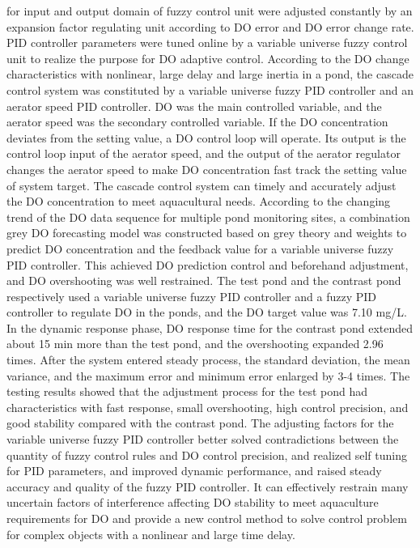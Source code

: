 \documentclass[12pt]{article}
\begin{document}
 for input and output domain of fuzzy control unit were adjusted constantly by an expansion factor regulating unit according to DO error and DO error change rate. PID controller parameters were tuned online by a variable universe fuzzy control unit to realize the purpose for DO adaptive control. According to the DO change characteristics with nonlinear, large delay and large inertia in a pond, the cascade control system was constituted by a variable universe fuzzy PID controller and an aerator speed PID controller. DO was the main controlled variable, and the aerator speed was the secondary controlled variable. If the DO concentration deviates from the setting value, a DO control loop will operate. Its output is the control loop input of the aerator speed, and the output of the aerator regulator changes the aerator speed to make DO concentration fast track the setting value of system target. The cascade control system can timely and accurately adjust the DO concentration to meet aquacultural needs. According to the changing trend of the DO data sequence for multiple pond monitoring sites, a combination grey DO forecasting model was constructed based on grey theory and weights to predict DO concentration and the feedback value for a variable universe fuzzy PID controller. This achieved DO prediction control and beforehand adjustment, and DO overshooting was well restrained. The test pond and the contrast pond respectively used a variable universe fuzzy PID controller and a fuzzy PID controller to regulate DO in the ponds, and the DO target value was 7.10 mg/L. In the dynamic response phase, DO response time for the contrast pond extended about 15 min more than the test pond, and the overshooting expanded 2.96 times.
 After the system entered steady process, the standard deviation, the mean variance, and the maximum error and minimum error enlarged by 3-4 times. The testing results showed that the adjustment process for the test pond had characteristics with fast response, small overshooting, high control precision, and good stability compared with the contrast pond. The adjusting factors for the variable universe fuzzy PID controller better solved contradictions between the quantity of fuzzy control rules and DO control precision, and realized self tuning for PID parameters, and improved dynamic performance, and raised steady accuracy and quality of the fuzzy PID controller. It can effectively restrain many uncertain factors of interference affecting DO stability to meet aquaculture requirements for DO and provide a new control method to solve control problem for complex objects with a nonlinear and large time delay.
			
\end{document}
